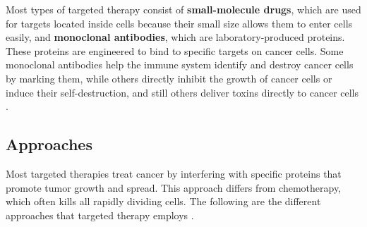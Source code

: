 Most types of targeted therapy consist of \textbf{small-molecule drugs}, which are used for targets located inside cells because their small size allows them to enter cells easily, and \textbf{monoclonal antibodies}, which are laboratory-produced proteins. These proteins are engineered to bind to specific targets on cancer cells. Some monoclonal antibodies help the immune system identify and destroy cancer cells by marking them, while others directly inhibit the growth of cancer cells or induce their self-destruction, and still others deliver toxins directly to cancer cells \cite{target_therapy1}. 

\subsection{Approaches}

Most targeted therapies treat cancer by interfering with specific proteins that promote tumor growth and spread. This approach differs from chemotherapy, which often kills all rapidly dividing cells. The following are the different approaches that targeted therapy employs \cite{target_therapy1}.

